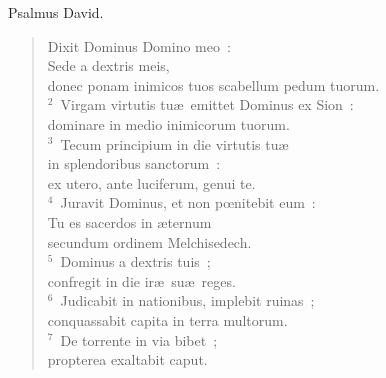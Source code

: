 \bchapter
\lettrine[lines=3,image=true,loversize=0.05,lraise=-0.03]{P}{}salmus David. \begin{flushleft}\begin{verse}\vspace{6pt}Dixit Dominus Domino meo~:\\ Sede a dextris meis,\\ donec ponam inimicos tuos scabellum pedum tuorum.\\
${}^{2}$~Virgam virtutis tu\ae\ emittet Dominus ex Sion~:\\ dominare in medio inimicorum tuorum.\\
${}^{3}$~Tecum principium in die virtutis tu\ae \\ in splendoribus sanctorum~:\\ ex utero, ante luciferum, genui te.\\
${}^{4}$~Juravit Dominus, et non pœnitebit eum~:\\ Tu es sacerdos in \ae ternum\\ secundum ordinem Melchisedech.\\
${}^{5}$~Dominus a dextris tuis~;\\ confregit in die ir\ae\ su\ae\ reges.\\
${}^{6}$~Judicabit in nationibus, implebit ruinas~;\\ conquassabit capita in terra multorum.\\
${}^{7}$~De torrente in via bibet~;\\ propterea exaltabit caput.\end{verse}\end{flushleft}



